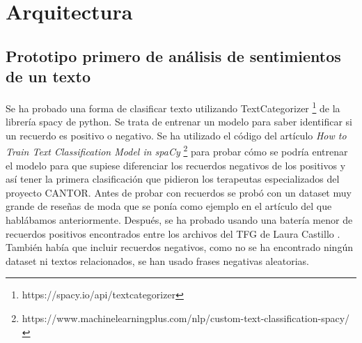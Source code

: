 \chapter{Arquitectura}
\label{cap:arquitectura}

\section{Prototipo primero de análisis de sentimientos de un texto}

Se ha probado una forma de clasificar texto utilizando TextCategorizer \footnote{https://spacy.io/api/textcategorizer} de la librería spacy de python. Se trata de entrenar un modelo para saber identificar si un recuerdo es positivo o negativo. Se ha utilizado el código del artículo \textit{How to Train Text Classification Model in spaCy} \footnote{https://www.machinelearningplus.com/nlp/custom-text-classification-spacy/} para probar cómo se podría entrenar el modelo para que supiese diferenciar los recuerdos negativos de los positivos y así tener la primera clasificación que pidieron los terapeutas especializados del proyecto CANTOR. Antes de probar con recuerdos se probó con un dataset muy grande de reseñas de moda que se ponía como ejemplo en el artículo del que hablábamos anteriormente. Después, se ha probado usando una batería menor de recuerdos positivos encontrados entre los archivos del TFG de Laura Castillo \citep{reminiscencia}. También había que incluir recuerdos negativos, como no se ha encontrado ningún dataset ni textos relacionados, se han usado frases negativas aleatorias.

